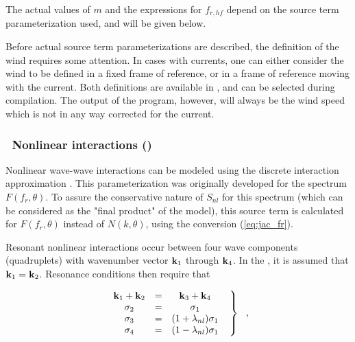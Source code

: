 \noindent
The actual values of $m$ and the expressions for $f_{r,hf}$ depend on the
source term parameterization used, and will be given below.

\vspace{\baselineskip} \noindent
Before actual source term parameterizations are described, the definition of
the wind requires some attention. In cases with currents, one can either
consider the wind to be defined in a fixed frame of reference, or in a frame
of reference moving with the current. Both definitions are available in \ws,
and can be selected during compilation. The output of the program, however,
will always be the wind speed which is not in any way corrected for the
current.


\vsssub
\subsubsection{~Nonlinear interactions (\dia)} \label{sec_dia}
\vsssub

Nonlinear wave-wave interactions can be modeled using the discrete interaction
approximation \citep[\dia,][]{art:Hea85b}. This parameterization was
originally developed for the spectrum $F(f_r ,\theta)$. To assure the
conservative nature of $S_{nl}$ for this spectrum (which can be considered as
the "final product" of the model), this source term is calculated for
$F(f_r,\theta)$ instead of $N(k,\theta)$, using the conversion
(\ref{eq:jac_fr}).

Resonant nonlinear interactions occur between four wave components
(quadruplets) with wavenumber vector $\mbox{\bf k}_1$ through $\mbox{\bf k}_4$. In the \dia, it
is assumed that $\mbox{\bf k}_1 = \mbox{\bf k}_2$. Resonance conditions then require that


\begin{equation} \left .
\begin{array}{ccc}
  \mbox{\bf k}_1 + \mbox{\bf k}_2 & = & \mbox{\bf k}_3 + \mbox{\bf k}_4          \\
  \sigma_2  & = & \sigma_1                   \\
  \sigma_3  & = & (1+\lambda_{nl})\sigma_1   \\
  \sigma_4  & = & (1-\lambda_{nl})\sigma_1
\end{array} \:\:\: \right \rbrace \:\:\: , \label{eq:resonance}
\end{equation}

